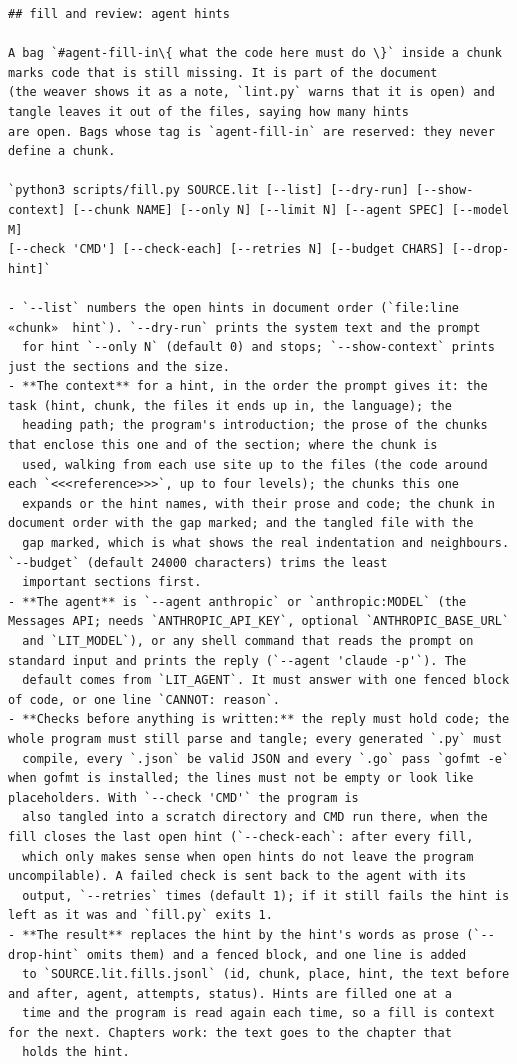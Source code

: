 \documentclass[10pt,a4paper]{article}
\newcounter{chunk}
\begin{document}
\begin{Verbatim}
## fill and review: agent hints

A bag `#agent-fill-in\{ what the code here must do \}` inside a chunk marks code that is still missing. It is part of the document
(the weaver shows it as a note, `lint.py` warns that it is open) and tangle leaves it out of the files, saying how many hints
are open. Bags whose tag is `agent-fill-in` are reserved: they never define a chunk.

`python3 scripts/fill.py SOURCE.lit [--list] [--dry-run] [--show-context] [--chunk NAME] [--only N] [--limit N] [--agent SPEC] [--model M]
[--check 'CMD'] [--check-each] [--retries N] [--budget CHARS] [--drop-hint]`

- `--list` numbers the open hints in document order (`file:line  «chunk»  hint`). `--dry-run` prints the system text and the prompt
  for hint `--only N` (default 0) and stops; `--show-context` prints just the sections and the size.
- **The context** for a hint, in the order the prompt gives it: the task (hint, chunk, the files it ends up in, the language); the
  heading path; the program's introduction; the prose of the chunks that enclose this one and of the section; where the chunk is
  used, walking from each use site up to the files (the code around each `<<<reference>>>`, up to four levels); the chunks this one
  expands or the hint names, with their prose and code; the chunk in document order with the gap marked; and the tangled file with the
  gap marked, which is what shows the real indentation and neighbours. `--budget` (default 24000 characters) trims the least
  important sections first.
- **The agent** is `--agent anthropic` or `anthropic:MODEL` (the Messages API; needs `ANTHROPIC_API_KEY`, optional `ANTHROPIC_BASE_URL`
  and `LIT_MODEL`), or any shell command that reads the prompt on standard input and prints the reply (`--agent 'claude -p'`). The
  default comes from `LIT_AGENT`. It must answer with one fenced block of code, or one line `CANNOT: reason`.
- **Checks before anything is written:** the reply must hold code; the whole program must still parse and tangle; every generated `.py` must
  compile, every `.json` be valid JSON and every `.go` pass `gofmt -e` when gofmt is installed; the lines must not be empty or look like placeholders. With `--check 'CMD'` the program is
  also tangled into a scratch directory and CMD run there, when the fill closes the last open hint (`--check-each`: after every fill,
  which only makes sense when open hints do not leave the program uncompilable). A failed check is sent back to the agent with its
  output, `--retries` times (default 1); if it still fails the hint is left as it was and `fill.py` exits 1.
- **The result** replaces the hint by the hint's words as prose (`--drop-hint` omits them) and a fenced block, and one line is added
  to `SOURCE.lit.fills.jsonl` (id, chunk, place, hint, the text before and after, agent, attempts, status). Hints are filled one at a
  time and the program is read again each time, so a fill is context for the next. Chapters work: the text goes to the chapter that
  holds the hint.


\end{Verbatim}
\end{document}
